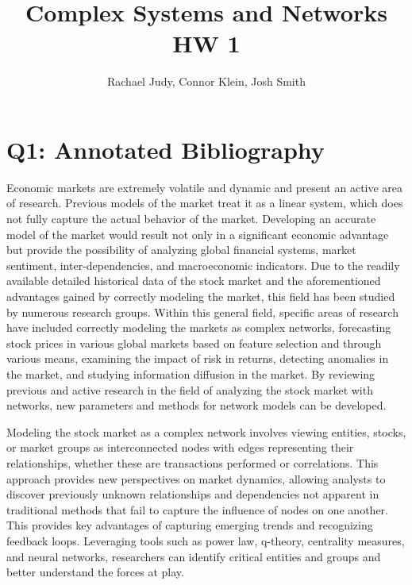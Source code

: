 \documentclass[12pt]{article}
\title{Complex Systems and Networks HW 1}
\author{Rachael Judy, Connor Klein, Josh Smith}
\begin{document}
\pgfplotsset{compat=1.18}
 
\maketitle

\section{Q1: Annotated Bibliography}

Economic markets are extremely volatile and dynamic and present an active area of research. Previous models of the market treat it as a linear system, which does not fully capture the actual behavior of the market. Developing an accurate model of the market would result not only in a significant economic advantage but provide the possibility of analyzing global financial systems, market sentiment, inter-dependencies, and macroeconomic indicators. Due to the readily available detailed historical data of the stock market and the aforementioned advantages gained by correctly modeling the market, this field has been studied by numerous research groups. Within this general field, specific areas of research have included correctly modeling the markets as complex networks, forecasting stock prices in various global markets based on feature selection and through various means, examining the impact of risk in returns, detecting anomalies in the market, and studying information diffusion in the market. By reviewing previous and active research in the field of analyzing the stock market with networks, new parameters and methods for network models can be developed.



Modeling the stock market as a complex network involves viewing entities, stocks, or market groups as interconnected nodes with edges representing their relationships, whether these are transactions performed or correlations. This approach provides new perspectives on market dynamics, allowing analysts to discover previously unknown relationships and dependencies not apparent in traditional methods that fail to capture the influence of nodes on one another. This provides key advantages of capturing emerging trends and recognizing feedback loops. Leveraging tools such as power law, q-theory, centrality measures, and neural networks, researchers can identify critical entities and groups and better understand the forces at play.
\end{document}
